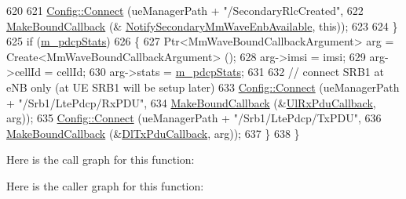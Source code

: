 \begin{DoxyCode}
620       
621       \hyperlink{group__config_ga4014f151241cd0939b6cb64409605736}{Config::Connect} (ueManagerPath + \textcolor{stringliteral}{"/SecondaryRlcCreated"},
622                        \hyperlink{group__makeboundcallback_ga1725d6362e6065faa0709f7c93f8d770}{MakeBoundCallback} (&
      \hyperlink{classns3_1_1MmWaveBearerStatsConnector_aa1b18db31a6f4815544b154f97ff79a5}{NotifySecondaryMmWaveEnbAvailable}, \textcolor{keyword}{this}));
623 
624     \}
625   \textcolor{keywordflow}{if} (\hyperlink{classns3_1_1MmWaveBearerStatsConnector_a6523c73cc057ed84faa3ddfc944ff67f}{m\_pdcpStats})
626     \{
627       Ptr<MmWaveBoundCallbackArgument> arg = Create<MmWaveBoundCallbackArgument> ();
628       arg->imsi = imsi;
629       arg->cellId = cellId; 
630       arg->stats = \hyperlink{classns3_1_1MmWaveBearerStatsConnector_a6523c73cc057ed84faa3ddfc944ff67f}{m\_pdcpStats};
631 
632       \textcolor{comment}{// connect SRB1 at eNB only (at UE SRB1 will be setup later)}
633       \hyperlink{group__config_ga4014f151241cd0939b6cb64409605736}{Config::Connect} (ueManagerPath + \textcolor{stringliteral}{"/Srb1/LtePdcp/RxPDU"},
634                        \hyperlink{group__makeboundcallback_ga1725d6362e6065faa0709f7c93f8d770}{MakeBoundCallback} (&\hyperlink{namespacens3_a269527c03607c9c885d7cff7667ec5e0}{UlRxPduCallback}, arg));
635       \hyperlink{group__config_ga4014f151241cd0939b6cb64409605736}{Config::Connect} (ueManagerPath + \textcolor{stringliteral}{"/Srb1/LtePdcp/TxPDU"},
636                        \hyperlink{group__makeboundcallback_ga1725d6362e6065faa0709f7c93f8d770}{MakeBoundCallback} (&\hyperlink{namespacens3_a7de82f7ed9986b9bcb67951f61e02ff4}{DlTxPduCallback}, arg));
637     \}
638 \}
\end{DoxyCode}


Here is the call graph for this function\+:




Here is the caller graph for this function\+:


